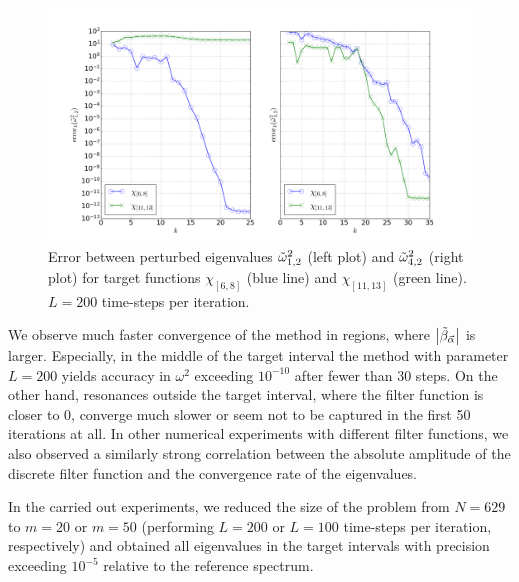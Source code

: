 \documentclass[a4paper,11pt,bibliography=totoc,listof=totoc,headinclude=true,cleardoublepage=empty,oneside]{scrbook}
\newcommand{\dffv}{\Tilde{\beta}_{\Vec{\alpha}}}
\begin{document}
\begin{figure}[h]
    \centering
    \includegraphics[width=1\linewidth]{latex//images//simulation/Figure_1.png}
    \caption{Error between perturbed eigenvalues $\Tilde{\omega}_{1,2}^2$ (left plot) and $\Tilde{\omega}_{4,2}^2$ (right plot) for target functions $\chi_{[6,8]}$ (blue line) and $\chi_{[11,13]}$ (green line). $L=200$ time-steps per iteration.}
    \label{fig:errors plot}
\end{figure}

We observe much faster convergence of the method in regions, where $\left|\dffv\right|$ is larger. Especially, in the middle of the target interval the method with parameter $L=200$ yields accuracy in $\omega^2$ exceeding $10^{-10}$ after fewer than 30 steps. On the other hand, resonances outside the target interval, where the filter function is closer to 0, converge much slower or seem not to be captured in the first 50 iterations at all. In other numerical experiments with different filter functions, we also observed a similarly strong correlation between the absolute amplitude of the discrete filter function and the convergence rate of the eigenvalues.

In the carried out experiments, we reduced the size of the problem from $N=629$ to $m=20$ or $m=50$ (performing $L=200$ or $L=100$ time-steps per iteration, respectively) and obtained all eigenvalues in the target intervals with precision exceeding $10^{-5}$ relative to the reference spectrum. 
\end{document}
